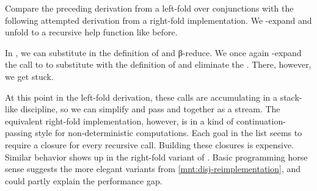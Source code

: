 \documentclass[runningheads,natbib=false]{llncs}
\begin{document}
Compare the preceding derivation from a left-fold over conjunctions
with the following attempted derivation from a right-fold
implementation. We \texteta{}-expand and unfold to a recursive help
function like before.



In , we can substitute in the definition of
 and β-reduce. We once again \texteta{}-expand the call to
 to substitute with the definition of
 and eliminate the . There,
however, we get stuck.


At this point in the left-fold derivation, these calls are
accumulating in a stack-like discipline, so we can simplify and pass
 and  together as a stream. The equivalent
right-fold implementation, however, is in a kind of
continuation-passing style for non-deterministic computations. Each
goal in the list seems to require a closure for every recursive call.
Building these closures is expensive. Similar behavior shows up in the
right-fold variant of . Basic programming horse sense
suggests the more elegant variants from
\cref{mnt:disj-reimplementation}, and could partly explain the
performance gap.
\end{document}
